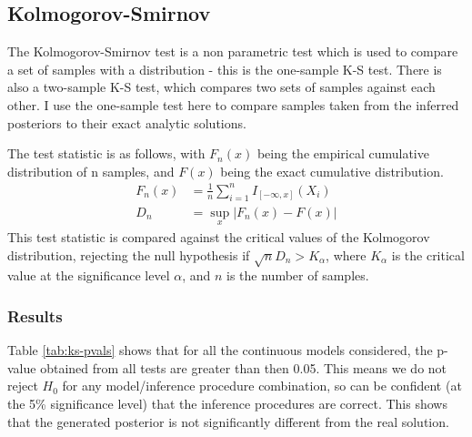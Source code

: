 \subsection{Kolmogorov-Smirnov}

The Kolmogorov-Smirnov test is a non parametric test which is used to compare a set of samples with a distribution - this is the one-sample K-S test. There is also a two-sample K-S test, which compares two sets of samples against each other. I use the one-sample test here to compare samples taken from the inferred posteriors to their exact analytic solutions.

The test statistic is as follows, with $F_n(x)$ being the empirical cumulative distribution of n samples, and $F(x)$ being the exact cumulative distribution.
\begin{align*}
	F_{n}(x) & =\frac{1}{n}\sum_{i=1}^{n}I_{[-\infty ,x]}(X_{i}) \\
	D_{n}    & =\sup_{x}|F_{n}(x)-F(x)|                          
\end{align*}
This test statistic is compared against the critical values of the Kolmogorov distribution, rejecting the null hypothesis if $\sqrt{n}D_n > K_\alpha$, where $K_\alpha$ is the critical value at the significance level $\alpha$, and $n$ is the number of samples.

\subsubsection{Results}

Table \ref{tab:ks-pvals} shows that for all the continuous models considered, the p-value obtained from all tests are greater than then 0.05. This means we do not reject $H_0$ for any model/inference procedure combination, so can be confident (at the 5\% significance level) that the inference procedures are correct. This shows that the generated posterior is not significantly different from the real solution.

\begin{table}[!ht]
	\centering
	\caption{p-values of K-S test on different models using different inference procedures}
	\label{tab:ks-pvals}
\end{table}


